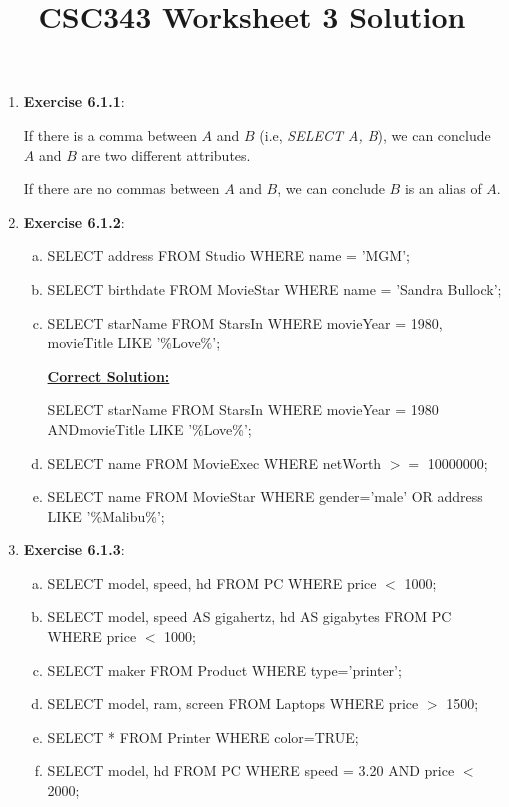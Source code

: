 \documentclass[12pt]{article}
\begin{document}
\title{CSC343 Worksheet 3 Solution}
\maketitle

\bigskip

\begin{enumerate}[1.]
    \item \textbf{Exercise 6.1.1}:

    \bigskip

    If there is a comma between $A$ and $B$ (i.e, \textit{SELECT A, B}), we can
    conclude $A$ and $B$ are two different attributes.

    \bigskip

    If there are no commas between $A$ and $B$, we can conclude $B$ is an alias
    of $A$.

    \item \textbf{Exercise 6.1.2}:

    \begin{enumerate}[a)]
        \item SELECT address FROM Studio WHERE name = 'MGM';
        \item SELECT birthdate FROM MovieStar WHERE name = 'Sandra Bullock';
        \item SELECT starName FROM StarsIn WHERE movieYear = 1980, movieTitle LIKE '\%Love\%';

        \bigskip

        \begin{mdframed}
            \underline{\textbf{Correct Solution:}}

            \bigskip

            SELECT starName FROM StarsIn WHERE movieYear = 1980 \color{red}AND\color{black}\:movieTitle LIKE '\%Love\%';
        \end{mdframed}
        \item SELECT name FROM MovieExec WHERE netWorth $>=$ 10000000;
        \item SELECT name FROM MovieStar WHERE gender='male' OR address LIKE '\%Malibu\%';
    \end{enumerate}

    \item \textbf{Exercise 6.1.3}:

    \begin{enumerate}[a)]
        \item SELECT model, speed, hd FROM PC WHERE price $<$ 1000;
        \item SELECT model, speed AS gigahertz, hd AS gigabytes FROM PC WHERE price $<$ 1000;
        \item SELECT maker FROM Product WHERE type='printer';
        \item SELECT model, ram, screen FROM Laptops WHERE price $>$ 1500;
        \item SELECT * FROM Printer WHERE color=TRUE;
        \item SELECT model, hd FROM PC WHERE speed = 3.20 AND price $<$ 2000;
    \end{enumerate}



\end{enumerate}
\end{document}
